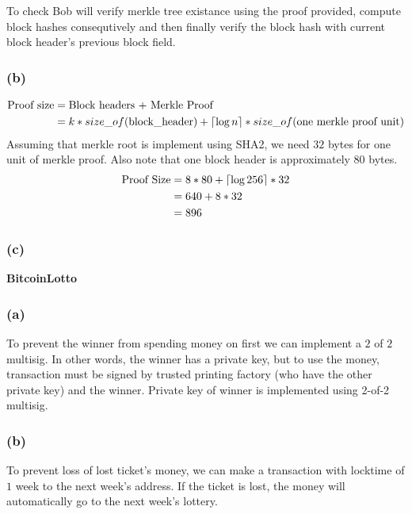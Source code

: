 \documentclass[a4paper]{article}
\DeclarePairedDelimiter{\ceil}{\lceil}{\rceil}
\begin{document}
To check Bob will verify merkle tree existance using the proof provided, compute block hashes consequtively
and then finally verify the block hash with current block header's previous block field.

\subsubsection*{(b)}
\begin{align*}
   \text{Proof size} &= \text{Block headers +  Merkle Proof} \\
    &= k*size\_of(\text{block\_header}) + \ceil{\log n}*size\_of(\text{one merkle proof unit})
\end{align*}
Assuming that merkle root is implement using SHA2, we need $32$ bytes for one unit of merkle proof.
Also note that one block header is approximately $80$ bytes.
\begin{align*}
    \text{Proof Size} &= 8*80 + \ceil{\log 256}*32 \\
                      &= 640 + 8*32 \\
                      &= 896
\end{align*}

\subsubsection*{(c)}

\begin{question}
    \textbf{BitcoinLotto}
\end{question}
\subsubsection*{(a)}
To prevent the winner from spending money on first we can implement a $2$  of $2$ multisig. In other words,
the winner has a private key, but to use the money, transaction must be signed by trusted printing factory
(who have the other private key) and the winner. Private key of winner is implemented using 2-of-2 multisig.

\subsubsection*{(b)}
To prevent loss of lost ticket's money, we can make a transaction with locktime of $1$ week to the next week's
address. If the ticket is lost, the money will automatically go to the next week's lottery.
\end{document}
